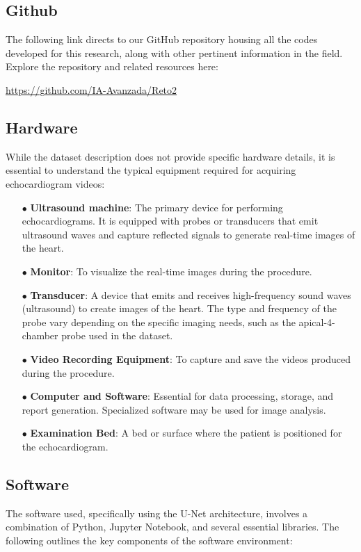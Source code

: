 \documentclass[runningheads]{llncs}
\begin{document}
\subsection{Github}
The following link directs to our GitHub repository housing all the codes developed for this research, along with other pertinent information in the field. Explore the repository and related resources here: 

\url{https://github.com/IA-Avanzada/Reto2}

\subsection{Hardware}
While the dataset description does not provide specific hardware details, it is essential to understand the typical equipment required for acquiring echocardiogram videos:

\begin{itemize}
    \item[$\bullet$] \textbf{Ultrasound machine}: The primary device for performing echocardiograms. It is equipped with probes or transducers that emit ultrasound waves and capture reflected signals to generate real-time images of the heart.
    \item[$\bullet$] \textbf{Monitor}: To visualize the real-time images during the procedure. 
    \item[$\bullet$] \textbf{Transducer}: A device that emits and receives high-frequency sound waves (ultrasound) to create images of the heart. The type and frequency of the probe vary depending on the specific imaging needs, such as the apical-4-chamber probe used in the dataset.
    \item[$\bullet$] \textbf{Video Recording Equipment}: To capture and save the videos produced during the procedure.
    \item[$\bullet$] \textbf{Computer and Software}: Essential for data processing, storage, and report generation. Specialized software may be used for image analysis.
    \item[$\bullet$] \textbf{Examination Bed}: A bed or surface where the patient is positioned for the echocardiogram.
\end{itemize}

\subsection{Software}
The software used, specifically using the U-Net architecture, involves a combination of Python, Jupyter Notebook, and several essential libraries. The following outlines the key components of the software environment:
\end{document}
